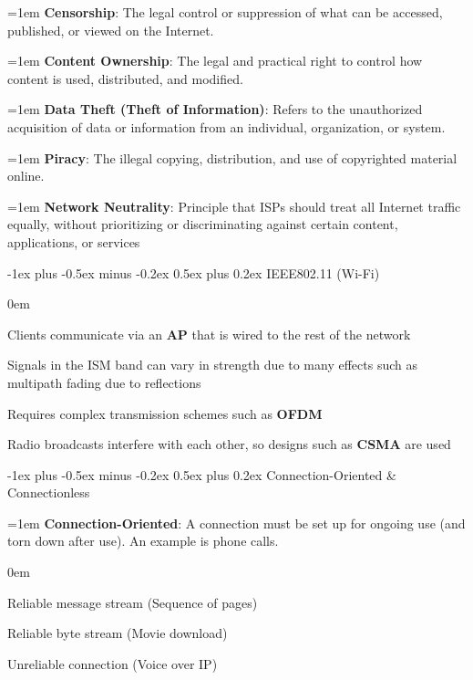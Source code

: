 \documentclass[letterpaper,8pt]{extarticle}
\makeatletter
\newcommand{\definition}[2]{
  \hangindent=1em
  \textbf{#1}: #2%
}
\renewcommand{\subsection}{\@startsection{subsection}{2}{0mm}%
  {-1ex plus -0.5ex minus -0.2ex}%
  {0.5ex plus 0.2ex}%
{\color{h2}\normalfont\fontsize{6}{6}\selectfont\bfseries}}
\let\olditemize\itemize \let\endolditemize\enditemize
\renewenvironment{itemize}{\olditemize \itemsep0em}{\endolditemize}
\makeatother
\begin{document}
\begin{multicols*}{5}
  \definition{Censorship}{The legal control or suppression of what can be accessed, published, or viewed on the Internet.}
  
  \definition{Content Ownership}{The legal and practical right to control how content is used, distributed, and modified.}
  
  \definition{Data Theft (Theft of Information)}{Refers to the unauthorized acquisition of data or information from an individual, organization, or system.}
  
  \definition{Piracy}{The illegal copying, distribution, and use of copyrighted material online.}
  
  \definition{Network Neutrality}{Principle that ISPs should treat all Internet traffic equally, without prioritizing or discriminating against certain content, applications, or services}
  
  \subsection{IEEE802.11 (Wi-Fi)}
  
  \begin{itemize}
    \item Clients communicate via an \textbf{AP} that is wired to the rest of the network
    \item Signals in the ISM band can vary in strength due to many effects such as multipath fading due to reflections
    \item Requires complex transmission schemes such as \textbf{OFDM}
    \item Radio broadcasts interfere with each other, so designs such as \textbf{CSMA} are used
  \end{itemize}
  
  \subsection{Connection-Oriented \& Connectionless}
  
  \definition{Connection-Oriented}{A connection must be set up for ongoing use (and torn down after use). An example is phone calls.}
  
  \begin{itemize}
    \item Reliable message stream (Sequence of pages)
    \item Reliable byte stream (Movie download)
    \item Unreliable connection (Voice over IP)
  \end{itemize}
  

\end{multicols*}
\end{document}
